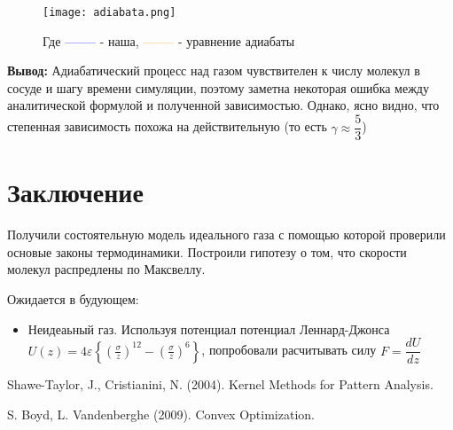 \documentclass[twoside,twocolumn]{article}
\theoremstyle{plain}
\theoremstyle{definition}
\begin{document}
\begin{figure}[!h]
{\texttt{[image: adiabata.png]}}
\caption{}
Где \textcolor{blue}{--------} - наша, \textcolor{orange}{--------} - уравнение адиабаты
\end{figure}


\textbf{Вывод:}
Адиабатический процесс над газом чувствителен к числу молекул в сосуде и шагу времени симуляции, поэтому заметна некоторая
ошибка между аналитической формулой и полученной зависимостью. Однако, ясно видно, что степенная зависимость
похожа на действительную (то есть $\gamma \approx \dfrac{5}{3}$)

\section{Заключение}
\indent Получили состоятельную модель идеального газа с помощью которой проверили основые законы термодинамики. Построили гипотезу о том,
что скорости молекул распредлены по Максвеллу.

Ожидается в будующем:
\begin{itemize}
\item Неидеаьный газ.
Используя потенциал потенциал Леннард-Джонса $ U(z)=4 \varepsilon\left\{\left(\frac{\sigma}{z}\right)^{12}-\left(\frac{\sigma}{z}\right)^{6}\right\}$, попробовали
расчитывать силу $F = \dfrac{dU}{dz}$
\end{itemize}


\begin{thebibliography}{99} %

Shawe-Taylor, J., Cristianini, N. (2004).
\newblock Kernel Methods for Pattern Analysis.

S. Boyd, L. Vandenberghe (2009).
\newblock Convex Optimization.

\end{thebibliography}

\end{document}
